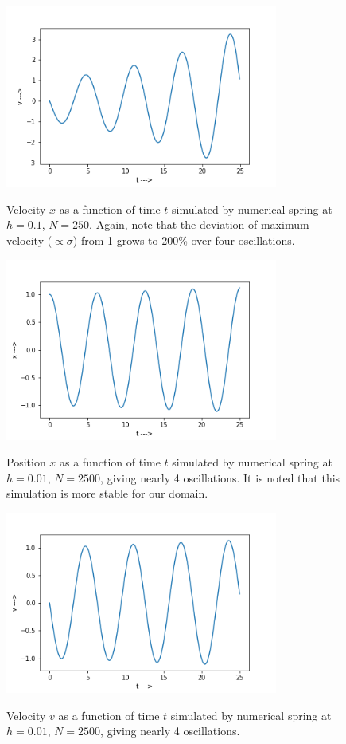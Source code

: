 \documentclass{report}
\begin{document}
\begin{figure}[H]
	\centering
	\includegraphics[width = 0.8\textwidth]{tVeA.png}
	\label{tVeA}
	\caption{Velocity $x$ as a function of time $t$ simulated by numerical spring at $h=0.1$, $N=250$. Again, note that the deviation of maximum velocity ($\propto\sigma$) from 1 grows to 200\% over four oscillations.}
\end{figure}
\begin{figure}[H]
	\centering
	\includegraphics[width = 0.8\textwidth]{tXe.png}
	\label{tXe}
	\caption{Position $x$ as a function of time $t$ simulated by numerical spring at $h=0.01$, $N=2500$, giving nearly 4 oscillations. It is noted that this simulation is more stable for our domain.}
\end{figure}
\begin{figure}[H]
	\centering
	\includegraphics[width = 0.8\textwidth]{tVe.png}
	\label{tVe}
	\caption{Velocity $v$ as a function of time $t$ simulated by numerical spring at $h=0.01$, $N=2500$, giving nearly 4 oscillations. }
\end{figure}
\end{document}

